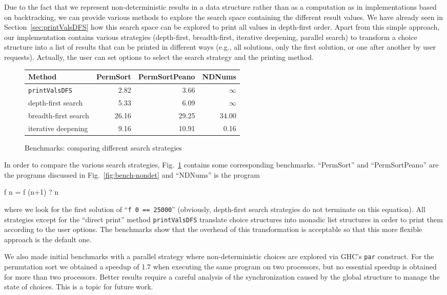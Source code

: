 \documentclass{llncs}
\newcommand{\code}[1]{\mbox{\small\texttt{#1}}}
\newcommand{\ccode}[1]{``\code{#1}''}
\begin{document}
Due to the fact that we represent non-deterministic results
in a data structure rather than as a computation as in implementations
based on backtracking, we can provide various methods to
explore the search space containing the different result values.
We have already seen in Section~\ref{sec:printValsDFS}
how this search space can be explored to print all values in
depth-first order.
Apart from this simple approach,
our implementation contains various strategies
(depth-first, breadth-first, iterative deepening, parallel search)
to transform a choice structure into a list of results
that can be printed in different ways (e.g., all solutions, only the first
solution, or one after another by user requests).
Actually, the user can set options to select the search strategy and
the printing method.

\begin{figure}
\centering
\begin{tabular}{|@{~~}l@{~~}|*{3}{@{~~}r@{~~}|}}
\hline
Method               & PermSort & PermSortPeano &  NDNums \\\hline
\code{printValsDFS}  &    2.82  &         3.66  & $\infty$ \\
depth-first search   &    5.33  &         6.09  & $\infty$ \\
breadth-first search &   26.16  &        29.25  &    34.00 \\
iterative deepening  &    9.16  &        10.91  &     0.16 \\
\hline
\end{tabular}
\caption{Benchmarks: comparing different search strategies}
 \label{fig:search-strategies}
\end{figure}
%
In order to compare the various search strategies,
Fig.~\ref{fig:search-strategies} contains some corresponding
benchmarks.
``PermSort'' and ``PermSortPeano'' are the programs
discussed in Fig.~\ref{fig:bench-nondet} and ``NDNums'' is the program
\begin{curry}
  f n = f (n+1) ? n
\end{curry}
where we look for the first solution of \ccode{f 0 == 25000}
(obviously, depth-first search strategies do not terminate on this
equation).
All strategies except for the ``direct print'' method \code{printValsDFS}
translate choice structures into monadic list structures
in order to print them according to the user options.
The benchmarks show that the overhead of this transformation
is acceptable so that this more flexible approach is the default one.

We also made initial benchmarks with a parallel strategy
where non-deterministic choices are explored via GHC's \code{par}
construct. For the permutation sort we obtained a speedup of 1.7
when executing the same program on two processors, but no essential
speedup is obtained for more than two processors.
Better results require a careful analysis of the synchronization
caused by the global structure to manage the state of choices.
This is a topic for future work.
\end{document}
